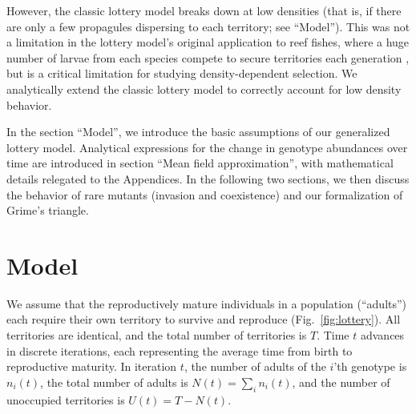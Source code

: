 \documentclass[11pt]{article}
\begin{document}
However, the classic lottery model breaks down at low densities (that is, if there are only a few propagules dispersing to each territory; see ``Model''). This was not a limitation in the lottery model's original application to reef fishes, where a huge number of larvae from each species compete to secure territories each generation \citep{chesson_1981}, but is a critical limitation for studying density-dependent selection. We analytically extend the classic lottery model to correctly account for low density behavior. 

In the section ``Model'', we introduce the basic assumptions of our generalized lottery model. Analytical expressions for the change in genotype abundances over time are introduced in section ``Mean field approximation'', with mathematical details relegated to the Appendices. In the following two sections, we then discuss the behavior of rare mutants (invasion and coexistence) and our formalization of Grime's triangle. 
 
\section*{Model}\label{sec:model}

We assume that the reproductively mature individuals in a population (``adults'') each require their own territory to survive and reproduce (Fig.~\ref{fig:lottery}). All territories are identical, and the total number of territories is $T$. Time $t$ advances in discrete iterations, each representing the average time from birth to reproductive maturity. In iteration $t$, the number of adults of the $i$'th genotype is $n_i(t)$, the total number of adults is $N(t)=\sum_i n_i(t)$, and the number of unoccupied territories is $U(t)=T-N(t)$. 
\end{document}

